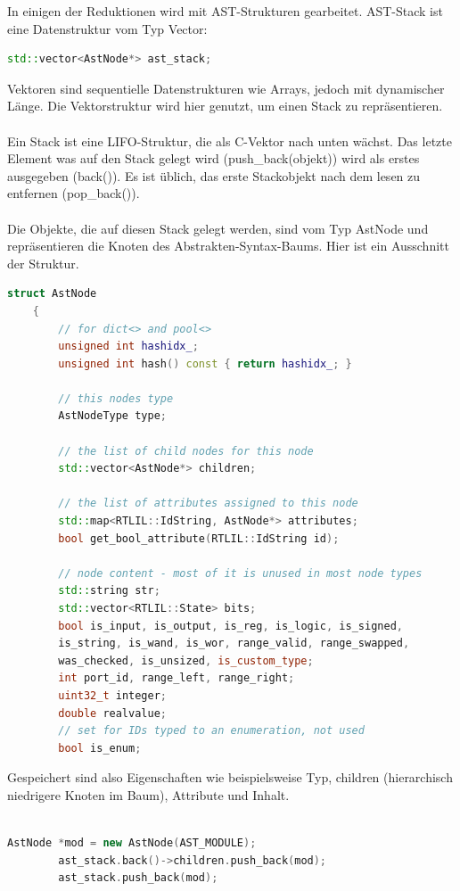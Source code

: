 \documentclass[11pt]{report}
\begin{document}
In einigen der Reduktionen wird mit AST-Strukturen gearbeitet.
AST-Stack ist eine Datenstruktur vom Typ Vector:
\begin{lstlisting}[language=C++]
	std::vector<AstNode*> ast_stack;
\end{lstlisting}
Vektoren sind sequentielle Datenstrukturen wie Arrays, jedoch mit dynamischer Länge.
Die Vektorstruktur wird hier genutzt, um einen Stack zu repräsentieren.
\\
\\
Ein Stack ist eine LIFO-Struktur, die als C-Vektor nach unten wächst. Das letzte Element was auf den Stack gelegt wird (push\_back(objekt)) wird als erstes ausgegeben (back()). Es ist üblich, das erste Stackobjekt nach dem lesen zu entfernen (pop\_back()).
\\
\\
Die Objekte, die auf diesen Stack gelegt werden, sind vom Typ AstNode und repräsentieren die Knoten des Abstrakten-Syntax-Baums.
Hier ist ein Ausschnitt der Struktur.
\begin{lstlisting}[language=C++]
	struct AstNode
	{
		// for dict<> and pool<>
		unsigned int hashidx_;
		unsigned int hash() const { return hashidx_; }

		// this nodes type
		AstNodeType type;

		// the list of child nodes for this node
		std::vector<AstNode*> children;

		// the list of attributes assigned to this node
		std::map<RTLIL::IdString, AstNode*> attributes;
		bool get_bool_attribute(RTLIL::IdString id);

		// node content - most of it is unused in most node types
		std::string str;
		std::vector<RTLIL::State> bits;
		bool is_input, is_output, is_reg, is_logic, is_signed, 
		is_string, is_wand, is_wor, range_valid, range_swapped, 
		was_checked, is_unsized, is_custom_type;
		int port_id, range_left, range_right;
		uint32_t integer;
		double realvalue;
		// set for IDs typed to an enumeration, not used
		bool is_enum;
\end{lstlisting}
Gespeichert sind also Eigenschaften wie beispielsweise Typ, children (hierarchisch niedrigere Knoten im Baum), Attribute und Inhalt.
\\
\\

\begin{lstlisting}[language=C++]
	AstNode *mod = new AstNode(AST_MODULE);
		ast_stack.back()->children.push_back(mod);
		ast_stack.push_back(mod);
\end{lstlisting}
\end{document}
